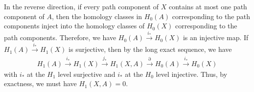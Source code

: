 \documentclass[10pt]{mypackage}
\begin{document}
\begin{solution}
\begin{enumerate}[(a)]
      In the reverse direction, if every path component of $X$ contains at most one path component of $A$, then the homology classes in $H_0\left( A \right)$ corresponding to the path components inject into the homology classes of $H_0\left( X \right)$ corresponding to the path components. Therefore, we have $H_0\left( A \right)\xrightarrow{i_{\ast}}H_0\left( X \right)$ is an injective map. If $H_1\left( A \right)\xrightarrow{i_{\ast}}H_1(X) $ is surjective, then by the long exact sequence, we have
      \begin{align*}
        H_1\left( A \right)\xrightarrow{i_{\ast}}H_1\left( X \right)\xrightarrow{j_{\ast}}H_1\left( X,A \right)\xrightarrow{\partial} H_0\left( A \right)\xrightarrow{i_{\ast}}H_0\left( X \right)
      \end{align*}
      with $i_{\ast}$ at the $H_1$ level surjective and $i_{\ast}$ at the $H_0$ level injective. Thus, by exactness, we must have $H_1\left( X,A \right) = 0$.
  \end{enumerate}
\end{solution}
\end{document}
